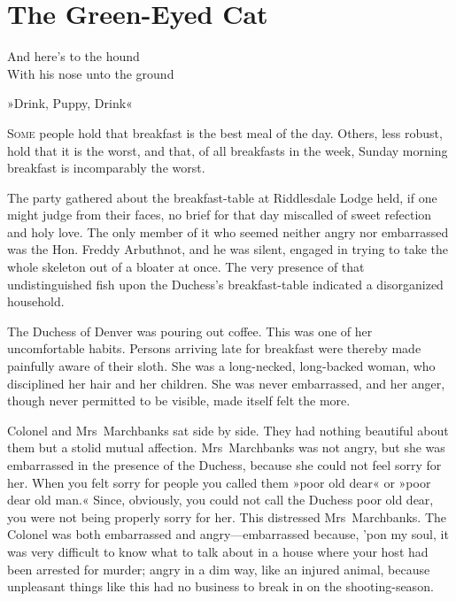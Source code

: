 

\chapter{The Green-Eyed Cat}

\epigraph{And here's to the hound\\With his nose unto the ground}{»Drink, Puppy, Drink«}


\lettrine[lines=4]{S}{ome} people hold that breakfast is the best meal of the day. Others, less robust, hold that it is the worst, and that, of all breakfasts in the week, Sunday morning breakfast is incomparably the worst.

\zz
The party gathered about the breakfast-table at Riddlesdale Lodge held, if one might judge from their faces, no brief for that day miscalled of sweet refection and holy love. The only member of it who seemed neither angry nor embarrassed was the Hon. Freddy Arbuthnot, and he was silent, engaged in trying to take the whole skeleton out of a bloater at once.  The very presence of that undistinguished fish upon the Duchess's breakfast-table indicated a disorganized household.

The Duchess of Denver was pouring out coffee. This was one of her uncomfortable habits. Persons arriving late for breakfast were thereby made painfully aware of their sloth. She was a long-necked, long-backed woman, who disciplined her hair and her children. She was never embarrassed, and her anger, though never permitted to be visible, made itself felt the more.

Colonel and Mrs~Marchbanks sat side by side. They had nothing beautiful about them but a stolid mutual affection. Mrs~Marchbanks was not angry, but she was embarrassed in the presence of the Duchess, because she could not feel sorry for her. When you felt sorry for people you called them »poor old dear« or »poor dear old man.« Since, obviously, you could not call the Duchess poor old dear, you were not being properly sorry for her. This distressed Mrs~Marchbanks. The Colonel was both embarrassed and angry—embarrassed because, 'pon my soul, it was very difficult to know what to talk about in a house where your host had been arrested for murder; angry in a dim way, like an injured animal, because unpleasant things like this had no business to break in on the shooting-season.

